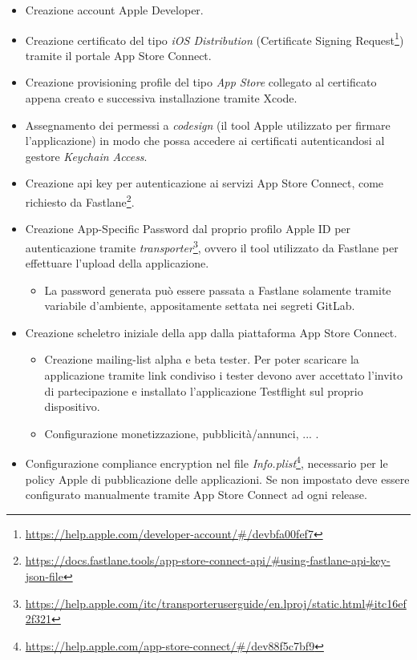 \begin{itemize}
    \item Creazione account Apple Developer.
    \item Creazione certificato del tipo \textit{iOS Distribution} (Certificate Signing Request\footnote{\url{https://help.apple.com/developer-account/\#/devbfa00fef7}}) tramite il portale App Store Connect.
    \item Creazione provisioning profile del tipo \textit{App Store} collegato al certificato appena creato e successiva installazione tramite Xcode.
    \item Assegnamento dei permessi a \textit{codesign} (il tool Apple utilizzato per firmare l'applicazione) in modo che possa accedere ai certificati autenticandosi al gestore \textit{Keychain Access}.
    \item Creazione api key per autenticazione ai servizi App Store Connect, come richiesto da Fastlane\footnote{\url{https://docs.fastlane.tools/app-store-connect-api/\#using-fastlane-api-key-json-file}}.
    \item Creazione App-Specific Password dal proprio profilo Apple ID per autenticazione tramite \textit{transporter}\footnote{\url{https://help.apple.com/itc/transporteruserguide/en.lproj/static.html\#itc16ef2f321}}, ovvero il tool utilizzato da Fastlane per effettuare l'upload della applicazione. 
    \begin{itemize}
        \item La password generata può essere passata a Fastlane solamente tramite variabile d'ambiente, appositamente settata nei segreti GitLab.
    \end{itemize}
    \item Creazione scheletro iniziale della app dalla piattaforma App Store Connect.
    \begin{itemize}
        \item Creazione mailing-list alpha e beta tester. Per poter scaricare la applicazione tramite link condiviso i tester devono aver accettato l'invito di partecipazione e installato l'applicazione Testflight sul proprio dispositivo.
        \item Configurazione monetizzazione, pubblicità/annunci, ... .
    \end{itemize}
    \item Configurazione compliance encryption nel file \textit{Info.plist}\footnote{\url{https://help.apple.com/app-store-connect/\#/dev88f5c7bf9}}, necessario per le policy Apple di pubblicazione delle applicazioni. Se non impostato deve essere configurato manualmente tramite App Store Connect ad ogni release.
\end{itemize}

